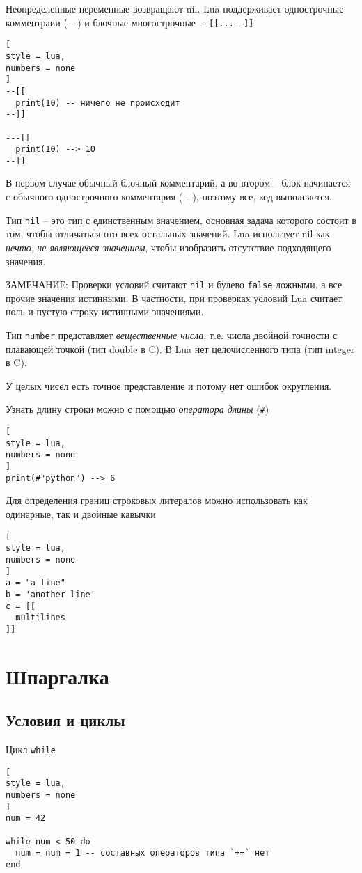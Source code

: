 \documentclass[%
	11pt,
	a4paper,
	utf8,
		]{article}
\begin{document}
Неопределенные переменные возвращают nil. Lua поддерживает однострочные комментраии (\verb|--|) и блочные многострочные \verb|--[[...--]]|
\begin{lstlisting}[
style = lua,
numbers = none	
]
--[[
  print(10) -- ничего не происходит
--]]

---[[
  print(10) --> 10
--]]
\end{lstlisting}

В первом случае обычный блочный комментарий, а во втором -- блок начинается с обычного однострочного комментария (\verb|--|), поэтому все, код выполняется.

Тип \texttt{nil} -- это тип с единственным значением, основная задача которого состоит в том, чтобы отличаться ото всех остальных значений. Lua использует nil как \emph{нечто}, \emph{не являющееся значением}, чтобы изобразить отсутствие подходящего значения.

ЗАМЕЧАНИЕ: Проверки условий считают \texttt{nil} и булево \texttt{false} ложными, а все прочие значения истинными. В частности, при проверках условий Lua считает ноль и пустую строку истинными значениями.

Тип \texttt{number} представляет \emph{вещественные числа}, т.е. числа двойной точности с плавающей точкой (тип double в C). В Lua нет целочисленного типа (тип integer в C).

У целых чисел есть точное представление и потому нет ошибок округления. 

Узнать длину строки можно с помощью \emph{оператора длины} (\verb|#|)
\begin{lstlisting}[
style = lua,
numbers = none	
]
print(#"python") --> 6
\end{lstlisting}

Для определения границ строковых литералов можно использовать как одинарные, так и двойные кавычки
\begin{lstlisting}[
style = lua,
numbers = none	
]
a = "a line"
b = 'another line'
c = [[
  multilines
]]
\end{lstlisting}

\section{Шпаргалка}

\subsection{Условия и циклы}

Цикл \texttt{while}
\begin{lstlisting}[
style = lua,
numbers = none
]
num = 42

while num < 50 do
  num = num + 1 -- составных операторов типа `+=` нет
end
\end{lstlisting}
\end{document}
